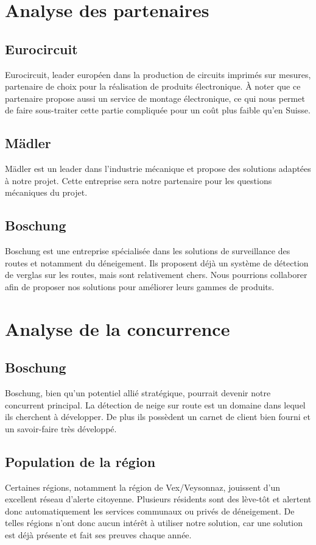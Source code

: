 \section{Analyse des partenaires}
\subsection{Eurocircuit}
Eurocircuit, leader européen dans la production de circuits imprimés sur mesures,
partenaire de choix pour la réalisation de produits électronique.
À noter que ce partenaire propose aussi un service de montage électronique,
ce qui nous permet de faire sous-traiter cette partie compliquée pour
un coût plus faible qu'en Suisse.

\subsection{Mädler}
Mädler est un leader dans l'industrie mécanique et propose des solutions adaptées à notre projet.
Cette entreprise sera notre partenaire pour les questions mécaniques du projet.

\subsection{Boschung}
Boschung est une entreprise spécialisée dans les solutions de surveillance des routes et
notamment du déneigement. Ils proposent déjà un système de détection de verglas
sur les routes, mais sont relativement chers. Nous pourrions collaborer
afin de proposer nos solutions pour améliorer leurs gammes de produits.

\section{Analyse de la concurrence}
\subsection{Boschung}
Boschung, bien qu'un potentiel allié stratégique, pourrait devenir notre concurrent
principal. La détection de neige sur route est un domaine dans lequel ils cherchent à
développer. De plus ils possèdent un carnet de client bien fourni et un savoir-faire
très développé.

\subsection{Population de la région}
Certaines régions, notamment la région de Vex/Veysonnaz, jouissent d'un
excellent réseau d'alerte citoyenne. Plusieurs résidents sont des lève-tôt et
alertent donc automatiquement les services communaux ou privés de déneigement.
De telles régions n'ont donc aucun intérêt à utiliser notre solution, car
une solution est déjà présente et fait ses preuves chaque année.
